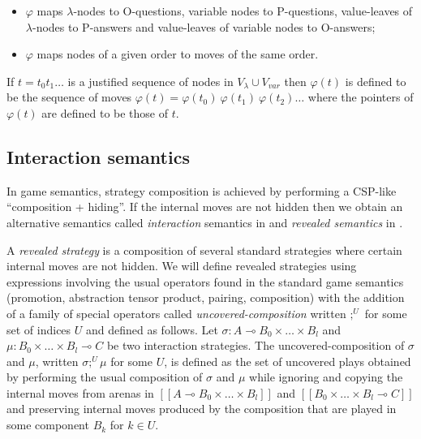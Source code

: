 \documentclass{llncs}
\newcommand{\lsem}{[\![} %
\newcommand{\rsem}{]\!]} %
\newcommand{\sem}[1]{{\lsem #1 \rsem}}
\newcommand\union{\cup}
\begin{document}
\begin{remark}
\begin{itemize}
\item $\varphi$ maps $\lambda$-nodes to O-questions, variable nodes to
P-questions, value-leaves of $\lambda$-nodes to P-answers and
value-leaves of variable nodes to O-answers;
\item $\varphi$ maps nodes of a given order to moves of the same order.
\end{itemize}
\end{remark}
If $t = t_0 t_1 \ldots$ is a justified sequence
of nodes in $V_\lambda \union V_{var}$ then $\varphi(t)$ is defined
to be the sequence of moves $\varphi(t) = \varphi(t_0)\ \varphi(t_1)\  \varphi(t_2) \ldots$
where the pointers of $\varphi(t)$ are defined to be those
of $t$.



\subsection{Interaction semantics}
\label{sec:interaction_semantics}

In game semantics, strategy composition is achieved by performing a
CSP-like ``composition + hiding''. If the internal moves are not hidden  
then we obtain an alternative semantics called \emph{interaction}
semantics in \cite{DBLP:conf/sas/DimovskiGL05} and \emph{revealed
semantics} in \cite{willgreenlandthesis}. 

A \emph{revealed strategy} is a composition of several standard strategies where
certain internal moves are not hidden. 
We will define revealed strategies using expressions involving the usual operators found in the standard game semantics (promotion, abstraction tensor product, pairing, composition) with the addition of a family of special operators called \emph{uncovered-composition} written
$;^U$ for some set of indices $U$ and defined as follows.
Let $\sigma : A \multimap B_0 \times \ldots \times B_l$ and $\mu : B_0 \times
\ldots \times B_l \multimap C$ be two interaction strategies.
The uncovered-composition of $\sigma$ and $\mu$, written $\sigma ;^U \mu$ for some $U$, is defined as
the set of uncovered plays obtained by performing the usual composition of $\sigma$ and $\mu$
while ignoring and copying the internal moves from arenas in
$\sem{A \multimap B_0 \times \ldots \times B_l}$ and $\sem{B_0 \times
\ldots \times B_l \multimap C}$ and preserving internal
moves produced by the composition that are played in some component $B_k$ for $k \in U$.
\end{document}
